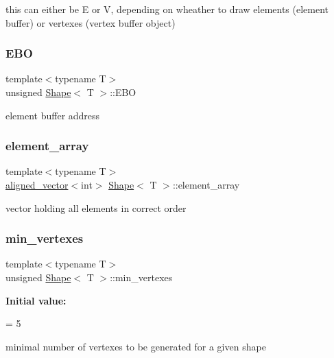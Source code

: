 this can either be \textquotesingle{}E\textquotesingle{} or \textquotesingle{}V\textquotesingle{}, depending on wheather to draw elements (element buffer) or vertexes (vertex buffer object) \mbox{\label{classShape_a95c775e548b129e23d2dd32e23fb0f3e}} 
\subsubsection{\texorpdfstring{E\+BO}{EBO}}
{\footnotesize\ttfamily template$<$typename T$>$ \\
unsigned \mbox{\hyperlink{classShape}{Shape}}$<$ T $>$\+::E\+BO\hspace{0.3cm}{\ttfamily [protected]}}

element buffer address \mbox{\label{classShape_accef3084e7e3897e01806b90da0a0ec8}} 
\subsubsection{\texorpdfstring{element\+\_\+array}{element\_array}}
{\footnotesize\ttfamily template$<$typename T$>$ \\
\mbox{\hyperlink{type__definitions_8hpp_accb98a876f193a416d9c8a02fe22d526}{aligned\+\_\+vector}}$<$int$>$ \mbox{\hyperlink{classShape}{Shape}}$<$ T $>$\+::element\+\_\+array\hspace{0.3cm}{\ttfamily [protected]}}

vector holding all elements in correct order \mbox{\label{classShape_acb30d3bdd3434dc2cb3074a4d61985ed}} 
\subsubsection{\texorpdfstring{min\+\_\+vertexes}{min\_vertexes}}
{\footnotesize\ttfamily template$<$typename T$>$ \\
unsigned \mbox{\hyperlink{classShape}{Shape}}$<$ T $>$\+::min\+\_\+vertexes\hspace{0.3cm}{\ttfamily [protected]}}

{\bfseries Initial value\+:}
\begin{DoxyCode}
=
        5
\end{DoxyCode}
minimal number of vertexes to be generated for a given shape \mbox{\label{classShape_a30771567edd66db5d14dc630f2d63f82}} 
